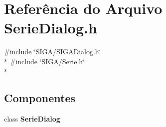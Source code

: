 \section{Referência do Arquivo Serie\+Dialog.\+h}
\label{_serie_dialog_8h}
{\ttfamily \#include \char`\"{}S\+I\+G\+A/\+S\+I\+G\+A\+Dialog.\+h\char`\"{}}\\*
{\ttfamily \#include \char`\"{}S\+I\+G\+A/\+Serie.\+h\char`\"{}}\\*
\subsection*{Componentes}
\begin{DoxyCompactItemize}
\item 
class {\bf Serie\+Dialog}
\end{DoxyCompactItemize}
